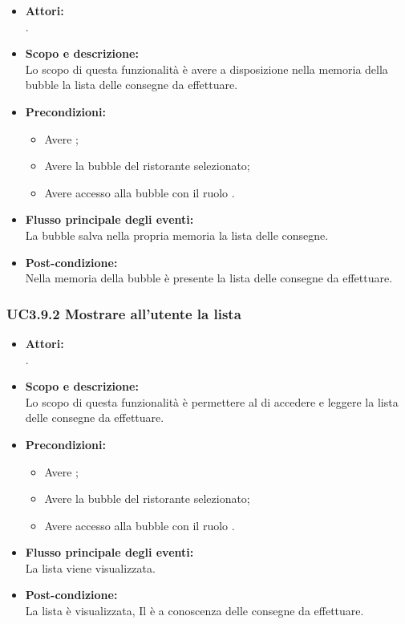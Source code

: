 \begin{itemize}
	\item \textbf{Attori:}
	\\.
	\item \textbf{Scopo e descrizione:} 
	\\Lo scopo di questa funzionalità è avere a disposizione nella memoria della bubble la lista delle consegne da effettuare.
	\item \textbf{Precondizioni:}
	\begin{itemize}
		\item Avere ;
		\item Avere la bubble del ristorante selezionato;
		\item Avere accesso alla bubble con il ruolo .
	\end{itemize}
	\item \textbf{Flusso principale degli eventi:}
	\\La bubble salva nella propria memoria la lista delle consegne.
	\item \textbf{Post-condizione:}
	\\Nella memoria della bubble è presente la lista delle consegne da effettuare.
\end{itemize}

\subsubsection{UC3.9.2 Mostrare all’utente la lista} \label{UC3.9.2}

\begin{itemize}
	\item \textbf{Attori:}
	\\.
	\item \textbf{Scopo e descrizione:} 
	\\Lo scopo di questa funzionalità è permettere al  di accedere e leggere la lista delle consegne da effettuare.
	\item \textbf{Precondizioni:}
	\begin{itemize}
		\item Avere ;
		\item Avere la bubble del ristorante selezionato;
		\item Avere accesso alla bubble con il ruolo .
	\end{itemize}
	\item \textbf{Flusso principale degli eventi:}
	\\La lista viene visualizzata.
	\item \textbf{Post-condizione:}
	\\La lista è visualizzata, Il  è a conoscenza delle consegne da effettuare.
\end{itemize}

